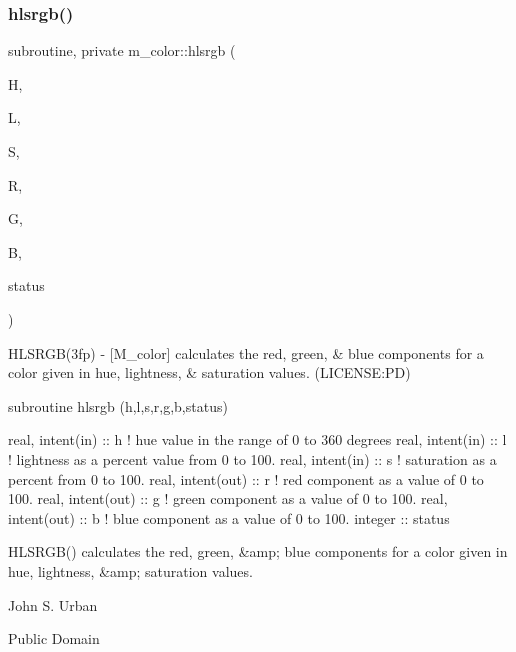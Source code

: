 \subsubsection{\texorpdfstring{hlsrgb()}{hlsrgb()}}
{\footnotesize\ttfamily subroutine, private m\+\_\+color\+::hlsrgb (\begin{DoxyParamCaption}\item[{real, intent(in)}]{H,  }\item[{real, intent(in)}]{L,  }\item[{real, intent(in)}]{S,  }\item[{real, intent(out)}]{R,  }\item[{real, intent(out)}]{G,  }\item[{real, intent(out)}]{B,  }\item[{integer}]{status }\end{DoxyParamCaption})\hspace{0.3cm}{\ttfamily [private]}}


\begin{DoxyDescription}
\item[\label{_HLSRGB}%
N\+A\+ME ]H\+L\+S\+R\+G\+B(3fp) -\/ \mbox{[}M\+\_\+color\mbox{]} calculates the red, green, \& blue components for a color given in hue, lightness, \& saturation values. (L\+I\+C\+E\+N\+SE\+:PD) 


\item[S\+Y\+N\+O\+P\+S\+IS ]
\begin{DoxyPre}
    subroutine hlsrgb (h,l,s,r,g,b,status)\end{DoxyPre}



\begin{DoxyPre}     real, intent(in)  :: h ! hue value in the range of 0 to 360 degrees
     real, intent(in)  :: l ! lightness as a percent value from 0 to 100.
     real, intent(in)  :: s ! saturation as a percent from 0 to 100.
     real, intent(out) :: r ! red component as a value of 0 to 100.
     real, intent(out) :: g ! green component as a value of 0 to 100.
     real, intent(out) :: b ! blue component as a value of 0 to 100.
     integer           :: status
    \end{DoxyPre}
 


\item[D\+E\+S\+C\+R\+I\+P\+T\+I\+ON ]\begin{DoxyVerb}HLSRGB() calculates the red, green, &amp; blue components for a
 color given in hue, lightness, &amp; saturation values.
\end{DoxyVerb}
 


\item[A\+U\+T\+H\+OR ]

John S. Urban




\item[L\+I\+C\+E\+N\+SE ]

Public Domain




\end{DoxyDescription}

